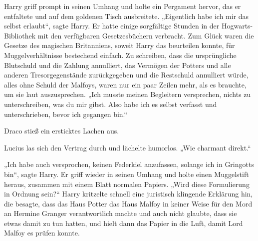 Harry griff prompt in seinen Umhang und holte ein Pergament hervor, das er entfaltete und auf dem goldenen Tisch ausbreitete.
„Eigentlich habe ich mir das selbst erlaubt“, sagte Harry.
Er hatte einige sorgfältige Stunden in der Hogwarts-Bibliothek mit den verfügbaren Gesetzesbüchern verbracht. Zum Glück waren die Gesetze des magischen Britanniens, soweit Harry das beurteilen konnte, für Muggelverhältnisse bestechend einfach. Zu schreiben, dass die ursprüngliche Blutschuld und die Zahlung annulliert, das Vermögen der Potters und alle anderen Tresorgegenstände zurückgegeben und die Restschuld annulliert würde, alles ohne Schuld der Malfoys, waren nur ein paar Zeilen mehr, als es brauchte, um sie laut auszusprechen.
„Ich musste meinen Begleitern versprechen, nichts zu unterschreiben, was du mir gibst. Also habe ich es selbst verfasst und unterschrieben, bevor ich gegangen bin.“

Draco stieß ein ersticktes Lachen aus.

Lucius las sich den Vertrag durch und lächelte humorlos.
„Wie charmant direkt.“

„Ich habe auch versprochen, keinen Federkiel anzufassen, solange ich in Gringotts bin“, sagte Harry. Er griff wieder in seinen Umhang und holte einen Muggelstift heraus, zusammen mit einem Blatt normalen Papiers. „Wird diese Formulierung in Ordnung sein?“
Harry kritzelte schnell eine juristisch klingende Erklärung hin, die besagte, dass das Haus Potter das Haus Malfoy in keiner Weise für den Mord an Hermine Granger verantwortlich machte und auch nicht glaubte, dass sie etwas damit zu tun hatten, und hielt dann das Papier in die Luft, damit Lord Malfoy es prüfen konnte.

